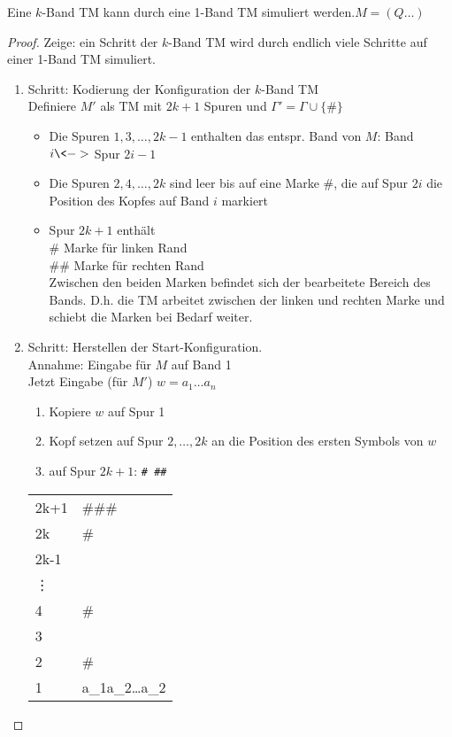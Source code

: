 \begin{Satz}[name={[Simulation von $k$-Band \acs*{TM} durch 1-Band \acs*{TM}]}]
	Eine $k$-Band \ac{TM} kann durch eine 1-Band \ac{TM} simuliert werden.\quad $M=(Q\dots)$
\end{Satz}
\begin{proof}
	Zeige: ein Schritt der $k$-Band \ac{TM} wird durch endlich viele Schritte auf einer 1-Band \ac{TM} simuliert.
	\begin{enumerate}
		\item Schritt: Kodierung der Konfiguration der $k$-Band \ac{TM}\\
		Definiere $M'$ als \ac{TM} mit $2k+1$ Spuren und $\Gamma'=\Gamma\cup\{\#\}$
		\begin{itemize}
			\item Die Spuren $1,3,\dots,2k-1$ enthalten das entspr. Band von $M$: Band $i\<->$ Spur $2i-1$
			\item Die Spuren $2,4,\dots,2k$ sind leer bis auf eine Marke \#, die auf Spur $2i$ die Position des Kopfes auf Band $i$ markiert
			\item Spur $2k+1$ enthält\\
			\#\phantom{\#} Marke für linken Rand\\
			\#\# Marke für rechten Rand\\
			Zwischen den beiden Marken befindet sich der bearbeitete Bereich des Bands. D.h. die \ac{TM} arbeitet zwischen der linken und rechten Marke und schiebt die Marken bei Bedarf weiter.
		\end{itemize}
		
		\item Schritt: Herstellen der Start-Konfiguration.\\
		Annahme: Eingabe für $M$ auf Band 1\\
		Jetzt Eingabe (für $M'$) $w = a_1\dots a_n$
		\begin{enumerate}
			\item Kopiere $w$ auf Spur 1
			\item Kopf setzen auf Spur $2,\dots,2k$ an die Position des ersten Symbols von $w$
			\item auf Spur $2k+1$: \verb*!# ##!
	\end{enumerate}
	\begin{tabular}{*2{M{l}}}
		2k+1 & \#\blank\#\#\\
		2k & \#\\
		2k-1 & \blank\\
		\vdots\\
		4 & \#\\
		3 & \blank\\
		2 & \#\\
		1 & a_1a_2\dots a_2
	\end{tabular} 
	

\end{enumerate}
\end{proof}
